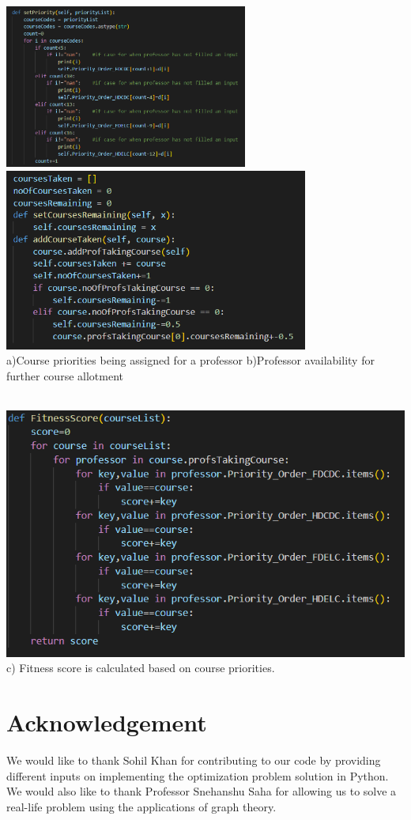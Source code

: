 \documentclass[a4paper,12pt]{article}
\begin{document}
\graphicspath{ {./images/} }
\includegraphics[width=8cm]{Professor.py1}
\includegraphics[width=10cm]{Professor.py2}\\
a)Course priorities being assigned for a professor   \hspace{1cm}       b)Professor availability for further course allotment \\ \\

\graphicspath{ {./images/} }
\includegraphics[width=\textwidth]{Fitness} \\ 
 \hspace{5cm} c) Fitness score is calculated based on course priorities.


\pagebreak


\section{Acknowledgement}
We would like to thank Sohil Khan for contributing to our code by providing different inputs on implementing the optimization problem solution in Python. We would also like to thank Professor Snehanshu Saha for allowing us to solve a real-life problem using the applications of graph theory.\\
\end{document}
